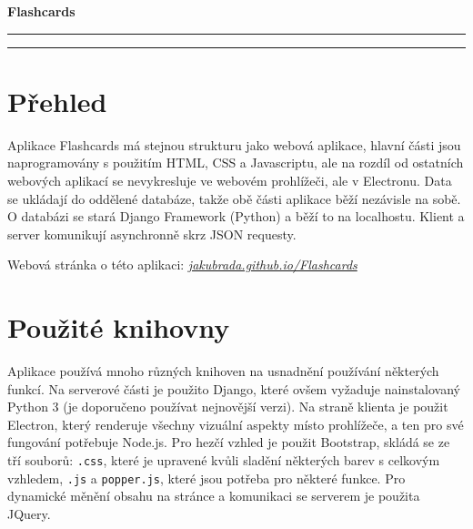 \documentclass[11pt]{article}
\let\oldtexttt\texttt
\renewcommand{\texttt}[1]{\oldtexttt{\textcolor{codehighlight}{#1}}}
\begin{document}
\begin{center}
  \textbf{\Huge Flashcards}\\
  \vspace{0.2cm}
  \rule{\textwidth}{0.5pt}
\end{center}
\tableofcontents
\begin{center}
  \rule{\textwidth}{0.5pt}
\end{center}
\clearpage
\hypertarget{pux159ehled}{%
\section{Přehled}\label{pux159ehled}}

Aplikace Flashcards má stejnou strukturu jako webová aplikace, hlavní
části jsou naprogramovány s použitím HTML, CSS a Javascriptu, ale na
rozdíl od ostatních webových aplikací se nevykresluje ve webovém
prohlížeči, ale v Electronu. Data se ukládají do oddělené databáze,
takže obě části aplikace běží nezávisle na sobě. O databázi se stará
Django Framework (Python) a běží to na localhostu. Klient a server
komunikují asynchronně skrz JSON requesty.

Webová stránka o této aplikaci:
\href{https://jakubrada.github.io/Flashcards/}{\emph{jakubrada.github.io/Flashcards}}

\hypertarget{pouux17eituxe9-knihovny}{%
\section{Použité knihovny}\label{pouux17eituxe9-knihovny}}

Aplikace používá mnoho různých knihoven na usnadnění používání některých
funkcí. Na serverové části je použito Django, které ovšem vyžaduje
nainstalovaný Python 3 (je doporučeno používat nejnovější verzi). Na
straně klienta je použit Electron, který renderuje všechny vizuální
aspekty místo prohlížeče, a ten pro své fungování potřebuje Node.js. Pro
hezčí vzhled je použit Bootstrap, skládá se ze tří souborů:
\texttt{.css}, které je upravené kvůli sladění některých barev s
celkovým vzhledem, \texttt{.js} a \texttt{popper.js}, které jsou potřeba
pro některé funkce. Pro dynamické měnění obsahu na stránce a komunikaci
se serverem je použita JQuery.
\end{document}
